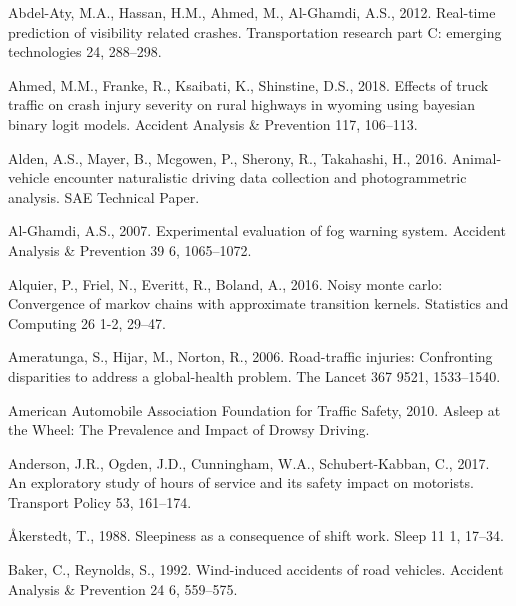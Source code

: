 \documentclass[12pt]{book}
\numberwithin{equation}{chapter}
\begin{document}
\setlength\parskip{0.8em}
\setlength\parindent{0pt}

\hypertarget{refs}{}
\leavevmode\hypertarget{ref-abdel2012real}{}%
Abdel-Aty, M.A., Hassan, H.M., Ahmed, M., Al-Ghamdi, A.S., 2012. Real-time prediction of visibility related crashes. Transportation research part C: emerging technologies 24, 288--298.

\leavevmode\hypertarget{ref-ahmed2018effects}{}%
Ahmed, M.M., Franke, R., Ksaibati, K., Shinstine, D.S., 2018. Effects of truck traffic on crash injury severity on rural highways in wyoming using bayesian binary logit models. Accident Analysis \& Prevention 117, 106--113.

\leavevmode\hypertarget{ref-alden2016animal}{}%
Alden, A.S., Mayer, B., Mcgowen, P., Sherony, R., Takahashi, H., 2016. Animal-vehicle encounter naturalistic driving data collection and photogrammetric analysis. SAE Technical Paper.

\leavevmode\hypertarget{ref-al2007experimental}{}%
Al-Ghamdi, A.S., 2007. Experimental evaluation of fog warning system. Accident Analysis \& Prevention 39 6, 1065--1072.

\leavevmode\hypertarget{ref-alquier2016noisy}{}%
Alquier, P., Friel, N., Everitt, R., Boland, A., 2016. Noisy monte carlo: Convergence of markov chains with approximate transition kernels. Statistics and Computing 26 1-2, 29--47.

\leavevmode\hypertarget{ref-ameratunga2006road}{}%
Ameratunga, S., Hijar, M., Norton, R., 2006. Road-traffic injuries: Confronting disparities to address a global-health problem. The Lancet 367 9521, 1533--1540.

\leavevmode\hypertarget{ref-aaafoundation}{}%
American Automobile Association Foundation for Traffic Safety, 2010. Asleep at the Wheel: The Prevalence and Impact of Drowsy Driving.

\leavevmode\hypertarget{ref-anderson2017exploratory}{}%
Anderson, J.R., Ogden, J.D., Cunningham, W.A., Schubert-Kabban, C., 2017. An exploratory study of hours of service and its safety impact on motorists. Transport Policy 53, 161--174.

\leavevmode\hypertarget{ref-aakerstedt1988sleepiness}{}%
Åkerstedt, T., 1988. Sleepiness as a consequence of shift work. Sleep 11 1, 17--34.

\leavevmode\hypertarget{ref-baker1992wind}{}%
Baker, C., Reynolds, S., 1992. Wind-induced accidents of road vehicles. Accident Analysis \& Prevention 24 6, 559--575.
\end{document}
